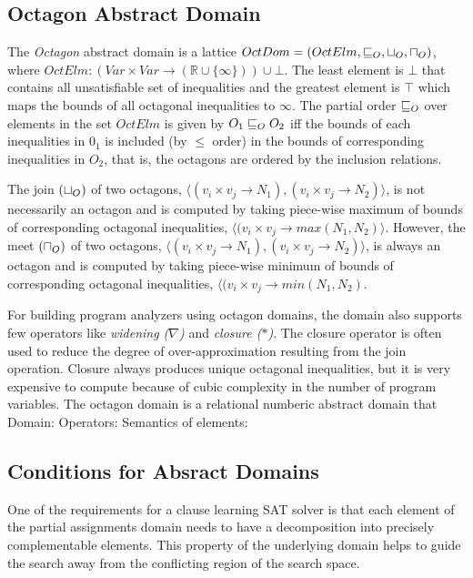 \subsection{Octagon Abstract Domain}
The {\em Octagon} abstract domain is a lattice 
$OctDom = (OctElm, \sqsubseteq_{O}, \sqcup_{O}, \sqcap_{O})$, where
$OctElm: (Var \times Var \rightarrow (\mathbb{R} \cup \{\infty\})) \cup \bot$. 
The least element is $\bot$ that contains all unsatisfiable 
set of inequalities and the greatest element is $\top$ which 
maps the bounds of all octagonal inequalities to $\infty$. 
The partial order $\sqsubseteq_{O}$ over elements in the set $OctElm$ is 
given by $O_1 \sqsubseteq_{O} O_2$ iff the bounds of each inequalities in $0_1$ 
is included (by $\leq$ order) in the bounds of corresponding inequalities 
in $O_2$, that is, the octagons are ordered by the inclusion relations.

The join $(\sqcup_{O})$ of two octagons, $\langle (v_i \times v_j \rightarrow N_1),
(v_i \times v_j \rightarrow N_2) \rangle$, is not necessarily an octagon 
and is computed by taking piece-wise maximum of bounds of corresponding 
octagonal inequalities, $\langle (v_i \times v_j \rightarrow max(N_1, N_2) \rangle$.
However, the meet $(\sqcap_{O})$ of two octagons, $\langle (v_i \times v_j \rightarrow N_1),
(v_i \times v_j \rightarrow N_2) \rangle$, is always an octagon and is 
computed by taking piece-wise minimum of bounds of corresponding 
octagonal inequalities, $\langle (v_i \times v_j \rightarrow min(N_1, N_2)$.

For building program analyzers using octagon domains, the domain also 
supports few operators like {\em widening ($\nabla$)} and {\em closure ($*$)}.
The closure operator is often used to reduce the degree of over-approximation 
resulting from the join operation. Closure always produces unique octagonal 
inequalities, but it is very expensive to compute because of cubic complexity 
in the number of program variables.   
The octagon domain is a relational numberic abstract domain that  
Domain:
Operators:
Semantics of elements:

\subsection{Conditions for Absract Domains}
One of the requirements for a clause learning SAT solver 
is that each element of the partial assignments domain 
needs to have a decomposition into precisely complementable 
elements.  This property of the underlying domain helps to 
guide the search away from the conflicting region of the 
search space.


